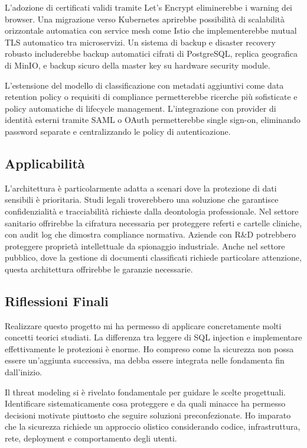 \documentclass[12pt, a4paper]{article}
\begin{document}
L'adozione di certificati validi tramite Let's Encrypt eliminerebbe i warning dei browser. Una migrazione verso Kubernetes aprirebbe possibilità di scalabilità orizzontale automatica con service mesh come Istio che implementerebbe mutual TLS automatico tra microservizi. Un sistema di backup e disaster recovery robusto includerebbe backup automatici cifrati di PostgreSQL, replica geografica di MinIO, e backup sicuro della master key su hardware security module.

L'estensione del modello di classificazione con metadati aggiuntivi come data retention policy o requisiti di compliance permetterebbe ricerche più sofisticate e policy automatiche di lifecycle management. L'integrazione con provider di identità esterni tramite SAML o OAuth permetterebbe single sign-on, eliminando password separate e centralizzando le policy di autenticazione.

\subsection{Applicabilità}

L'architettura è particolarmente adatta a scenari dove la protezione di dati sensibili è prioritaria. Studi legali troverebbero una soluzione che garantisce confidenzialità e tracciabilità richieste dalla deontologia professionale. Nel settore sanitario offrirebbe la cifratura necessaria per proteggere referti e cartelle cliniche, con audit log che dimostra compliance normativa. Aziende con R\&D potrebbero proteggere proprietà intellettuale da spionaggio industriale. Anche nel settore pubblico, dove la gestione di documenti classificati richiede particolare attenzione, questa architettura offrirebbe le garanzie necessarie.

\subsection{Riflessioni Finali}

Realizzare questo progetto mi ha permesso di applicare concretamente molti concetti teorici studiati. La differenza tra leggere di SQL injection e implementare effettivamente le protezioni è enorme. Ho compreso come la sicurezza non possa essere un'aggiunta successiva, ma debba essere integrata nelle fondamenta fin dall'inizio.

Il threat modeling si è rivelato fondamentale per guidare le scelte progettuali. Identificare sistematicamente cosa proteggere e da quali minacce ha permesso decisioni motivate piuttosto che seguire soluzioni preconfezionate. Ho imparato che la sicurezza richiede un approccio olistico considerando codice, infrastruttura, rete, deployment e comportamento degli utenti.
\end{document}
